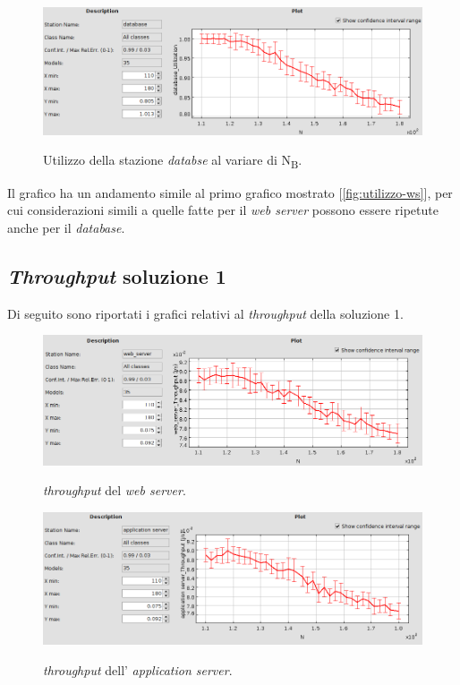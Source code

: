 \documentclass[../main.tex]{subfiles}
\begin{document}
    \begin{figure}[H]
        \centering
        \includegraphics[scale = 0.45]{assets/db_ut_1.png}\\
        \caption[\textit{Utilizzo} della stazione \textit{database}]{Utilizzo della stazione\textit{
            databse} al variare di N\textsubscript{B}.}
        \label{fig:utilizzo-db}
    \end{figure}
    Il grafico ha un andamento simile al primo grafico mostrato [\ref{fig:utilizzo-ws}], per cui
    considerazioni simili a quelle fatte per il \textit{web server} possono essere ripetute anche per il \textit{database}.

    \subsection{\textit{Throughput} soluzione 1}\label{subsec:throughput-soluzione-1}
    Di seguito sono riportati i grafici relativi al \textit{throughput} della soluzione 1.
    \begin{figure}[H]
        \centering
        \includegraphics[scale = 0.45]{assets/ws_th_1.png}\\
        \caption[\textit{Throughput} del \textit{web server}]{\textit{throughput} del \textit{web server}.}
        \label{fig:throughput-time-ws}
    \end{figure}

    \begin{figure}[H]
        \centering
        \includegraphics[scale = 0.45]{assets/as_th_1.png}\\
        \caption[\textit{Throughput} dell' \textit{application server}]{\textit{throughput} dell' \textit{application server}.}
        \label{fig:throughput-time-as}
    \end{figure}
\end{document}
